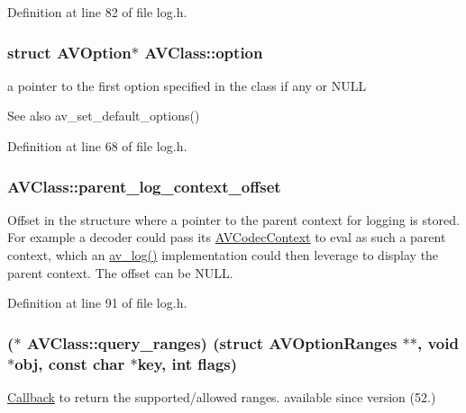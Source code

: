 Definition at line 82 of file log.\+h.

\subsubsection[{\texorpdfstring{option}{option}}]{ struct {\bf A\+V\+Option}$\ast$ A\+V\+Class\+::option}\hypertarget{struct_a_v_class_a75207076350fd2342191bc2091699f00}{}\label{struct_a_v_class_a75207076350fd2342191bc2091699f00}
a pointer to the first option specified in the class if any or N\+U\+LL

\begin{DoxySeeAlso}{See also}
av\+\_\+set\+\_\+default\+\_\+options() 
\end{DoxySeeAlso}


Definition at line 68 of file log.\+h.

\subsubsection[{\texorpdfstring{parent\+\_\+log\+\_\+context\+\_\+offset}{parent_log_context_offset}}]{ A\+V\+Class\+::parent\+\_\+log\+\_\+context\+\_\+offset}\hypertarget{struct_a_v_class_a88948c8a7c6515181771615a54a808bf}{}\label{struct_a_v_class_a88948c8a7c6515181771615a54a808bf}
Offset in the structure where a pointer to the parent context for logging is stored. For example a decoder could pass its \hyperlink{struct_a_v_codec_context}{A\+V\+Codec\+Context} to eval as such a parent context, which an \hyperlink{group__lavu__log_gabd386ffd4b27637cf34e98d5d1a6e8ae}{av\+\_\+log()} implementation could then leverage to display the parent context. The offset can be N\+U\+LL. 

Definition at line 91 of file log.\+h.

\subsubsection[{\texorpdfstring{query\+\_\+ranges}{query_ranges}}]{($\ast$ A\+V\+Class\+::query\+\_\+ranges) (struct {\bf A\+V\+Option\+Ranges} $\ast$$\ast$, {\bf void} $\ast$obj, {\bf const} char $\ast$key, {\bf int} flags)}\hypertarget{struct_a_v_class_a1f25d6b76f5a8b474cc1cb16aa5ed5df}{}\label{struct_a_v_class_a1f25d6b76f5a8b474cc1cb16aa5ed5df}
\hyperlink{class_callback}{Callback} to return the supported/allowed ranges. available since version (52.) 

